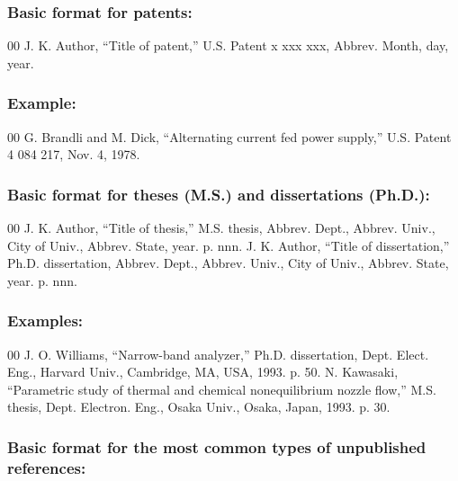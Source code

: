 \documentclass{IEEEoj-data}
\begin{document}
{\subsubsection*{Basic format for patents:}

\begin{thebibliography}{00}
 J. K. Author, ``Title of patent,'' U.S. Patent {x xxx xxx}, Abbrev. Month, day, year.
\end{thebibliography}

\subsubsection*{Example:}

\begin{thebibliography}{00}
 G. Brandli and M. Dick, ``Alternating current fed power supply,'' U.S. Patent 4 084 217, Nov. 4, 1978.
\end{thebibliography}

\subsubsection*{Basic format for theses (M.S.) and dissertations (Ph.D.):}

\begin{thebibliography}{00}
 J. K. Author, ``Title of thesis,'' M.S. thesis, Abbrev. Dept., Abbrev.
Univ., City of Univ., Abbrev. State, year. p. nnn.
 J. K. Author, ``Title of dissertation,'' Ph.D. dissertation, Abbrev.
Dept., Abbrev. Univ., City of Univ., Abbrev. State, year. p. nnn.
\end{thebibliography}

\subsubsection*{Examples:}

\begin{thebibliography}{00}
 J. O. Williams, ``Narrow-band analyzer,'' Ph.D. dissertation, Dept. Elect. Eng., Harvard Univ., Cambridge, MA, USA, 1993. p. 50.
 N. Kawasaki, ``Parametric study of thermal and chemical nonequilibrium nozzle flow,'' M.S. thesis, Dept. Electron. Eng., Osaka Univ., Osaka, Japan, 1993. p. 30.
\end{thebibliography}

\subsubsection*{Basic format for the most common types of unpublished references:}

}
\end{document}
